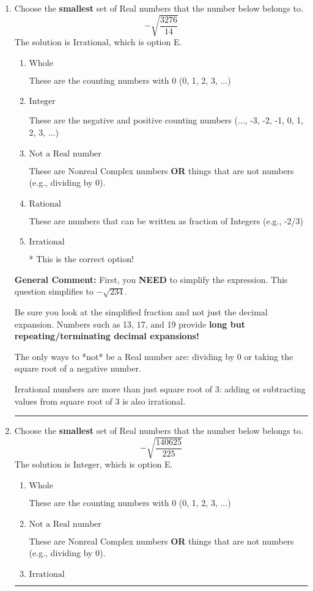 \documentclass{extbook}[14pt]
\newcommand{\litem}[1]{\item #1

\rule{\textwidth}{0.4pt}}
\begin{document}
\begin{enumerate}\litem{
Choose the \textbf{smallest} set of Real numbers that the number below belongs to.
\[ -\sqrt{\frac{3276}{14}} \]The solution is \( \text{Irrational} \), which is option E.\begin{enumerate}[label=\Alph*.]
\item \( \text{Whole} \)

These are the counting numbers with 0 (0, 1, 2, 3, ...)
\item \( \text{Integer} \)

These are the negative and positive counting numbers (..., -3, -2, -1, 0, 1, 2, 3, ...)
\item \( \text{Not a Real number} \)

These are Nonreal Complex numbers \textbf{OR} things that are not numbers (e.g., dividing by 0).
\item \( \text{Rational} \)

These are numbers that can be written as fraction of Integers (e.g., -2/3)
\item \( \text{Irrational} \)

* This is the correct option!
\end{enumerate}

\textbf{General Comment:} First, you \textbf{NEED} to simplify the expression. This question simplifies to $-\sqrt{234}$. 
 
 Be sure you look at the simplified fraction and not just the decimal expansion. Numbers such as 13, 17, and 19 provide \textbf{long but repeating/terminating decimal expansions!} 
 
 The only ways to *not* be a Real number are: dividing by 0 or taking the square root of a negative number. 
 
 Irrational numbers are more than just square root of 3: adding or subtracting values from square root of 3 is also irrational.
}
\litem{
Choose the \textbf{smallest} set of Real numbers that the number below belongs to.
\[ -\sqrt{\frac{140625}{225}} \]The solution is \( \text{Integer} \), which is option E.\begin{enumerate}[label=\Alph*.]
\item \( \text{Whole} \)

These are the counting numbers with 0 (0, 1, 2, 3, ...)
\item \( \text{Not a Real number} \)

These are Nonreal Complex numbers \textbf{OR} things that are not numbers (e.g., dividing by 0).
\item \( \text{Irrational} \)


\end{enumerate}}
\end{enumerate}
\end{document}
